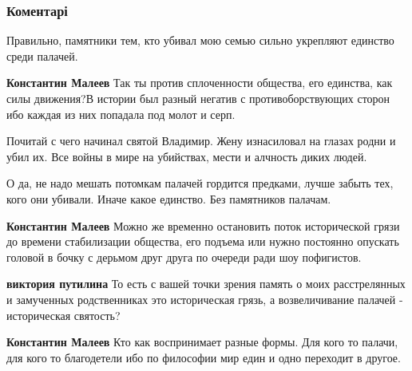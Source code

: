  
 
 
 
 
\subsubsection{Коментарі}
\label{sec:24_11_2021.fb.putilina_viktoria.kiev.1.ukrvlast.cmt}

\begin{itemize} %
Правильно, памятники тем, кто убивал мою семью сильно укрепляют единство среди палачей.

\begin{itemize} %
\textbf{Константин Малеев} Так ты против сплоченности общества, его единства, как силы движения?В истории был разный негатив с противоборствующих сторон ибо каждая из них попадала под молот и серп.

Почитай с чего начинал святой Владимир. Жену изнасиловал на глазах родни и убил их. Все войны в мире на убийствах, мести и алчность диких людей.

О да, не надо мешать потомкам палачей гордится предками, лучше забыть тех, кого они убивали. Иначе какое единство. Без памятников палачам.

\textbf{Константин Малеев} Можно же временно остановить поток исторической грязи до времени стабилизации общества, его подъема или нужно постоянно опускать головой в бочку с дерьмом друг друга по очереди ради шоу пофигистов.

\textbf{виктория путилина} То есть с вашей точки зрения память о моих расстрелянных и замученных родственниках это историческая грязь, а возвеличивание палачей - историческая святость?

\textbf{Константин Малеев} Кто как воспринимает разные формы. Для кого то палачи, для кого то благодетели ибо по философии мир един и одно переходит в другое.
\end{itemize} %

\end{itemize} %
